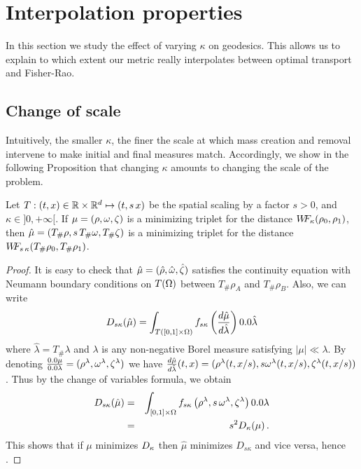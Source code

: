 
\section{Interpolation properties}
\label{sec-interpolation}

In this section we study the effect of varying $\kappa$ on geodesics. This allows us to explain to which extent our metric really interpolates between optimal transport and Fisher-Rao.

\subsection{Change of scale}

Intuitively, the smaller $\kappa$, the finer the scale at which mass creation and removal intervene to make initial and final measures match. Accordingly, we show in the following Proposition that changing $\kappa$ amounts to changing the scale of the problem.

\begin{proposition}
Let $T: (t,x) \in \mathbb{R} \times \mathbb{R}^d \mapsto (t,s\, x)$ be the spatial scaling by a factor $s>0$, and $\kappa \in ]0,+\infty[$. If $\mu=(\rho,\omega,\zeta)$ is a minimizing triplet for the distance $W\! \! F_{\kappa}(\rho_0,\rho_1)$, then $\hat{\mu}=(T_{\#}\rho,s\, T_{\#}\omega,T_{\#}\zeta)$ is a minimizing triplet for the distance $W\! \! F_{s\, \kappa}(T_{\#}\rho_0,T_{\#}\rho_1)$.
\end{proposition}

\begin{proof}
It is easy to check that $\hat{\mu}=(\hat{\rho},\hat{\omega},\hat{\zeta})$ satisfies the continuity equation with Neumann boundary conditions on $T(\Omega)$ between $T_{\#}\rho_A$ and $T_{\#}\rho_B$. Also, we can write
\[
\ifoncN_{s\kappa}(\hat{\mu}) 
= \int_{T([0,1]\times \Om)} \foncN_{s\kappa} \left( \frac{d\hat{\mu}}{d\hat{\lambda}} \right) \d\hat{\lambda}
\]
where $\hat{\lambda}=T_{\#} \lambda$ and $\lambda$ is any non-negative Borel measure satisfying $|\mu| \ll \lambda$. By denoting $ \frac{\d\mu}{\d\lambda} =(\rho^{\lambda},\M^{\lambda},\Z^{\lambda})$ we have $\frac{d\hat{\mu}}{d\hat{\lambda}}(t,x)=(\rho^{\lambda}(t,x/s),s\omega^{\lambda}(t,x/s),\zeta^{\lambda}(t,x/s))$. Thus by the change of variables formula, we obtain
\begin{eqnarray*}
\ifoncN_{s\kappa}(\hat{\mu}) 
&=& \int_{[0,1]\times \Om} \foncN_{s\kappa}\left(\rho^{\lambda},s\, \M^{\lambda},\Z^{\lambda} \right) \d\lambda\\
&=& s^2 \ifoncN_{\kappa}(\mu) \, .
\end{eqnarray*}
This shows that if $\mu$ minimizes $D_{\kappa}$ then $\hat{\mu}$ minimizes $D_{s\kappa}$ and vice versa, hence .
\end{proof}

